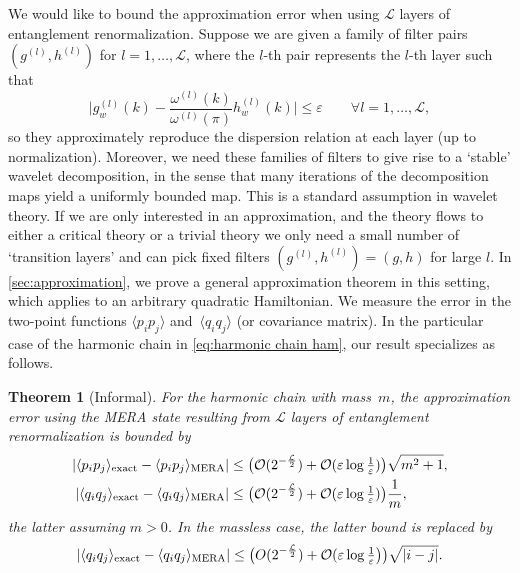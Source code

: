 \documentclass[submission, Phys]{SciPost}
\newtheorem*{thm*}{Theorem}
\theoremstyle{definition}
\theoremstyle{remark}
\DeclareMathOperator{\mera}{MERA}
\DeclareMathOperator{\exact}{exact}
\DeclarePairedDelimiter{\abs}{\lvert}{\rvert}
\newcommand{\eps}{\varepsilon}
\newcommand{\cL}{\mathcal L}
\newcommand{\change}[1]{#1}
\begin{document}
\change{We would like to bound the approximation error when using $\cL$ layers of entanglement renormalization}.
Suppose we are given a family of filter pairs $(g^{(l)},h^{(l)})$ for $l=1, \ldots, \cL$, where the $l$-th pair represents the $l$-th layer such that
\begin{equation}\label{eq:approximate phase main}
  \bigl\lvert g^{(l)}_w(k) - \frac {\omega^{(l)}(k)}{\omega^{(l)}(\pi)} h^{(l)}_w(k) \bigr\lvert \leq \eps
\qquad \forall l=1,\dots, \cL,
\end{equation}
so they approximately reproduce the dispersion relation at each layer (up to normalization).
Moreover, we need these families of filters to give rise to a `stable' wavelet decomposition, in the sense that many iterations of the decomposition maps yield a uniformly bounded map.
This is a standard assumption in wavelet theory.
If we are only interested in an approximation, and the theory flows to either a critical theory or a trivial theory we only need a small number of `transition layers' and can pick fixed filters $(g^{(l)},h^{(l)}) = (g,h)$ for large $l$.
In \cref{sec:approximation}, we prove a general approximation theorem in this setting, which applies to an arbitrary quadratic Hamiltonian.
We measure the error in the two-point functions $\langle p_i p_j \rangle$ and~$\langle q_i q_j \rangle$ (or covariance matrix).
In the particular case of the harmonic chain in \cref{eq:harmonic chain ham}, our result specializes as follows.

\begin{thm*}[Informal]\label{thm:harmonic chain}
For the harmonic chain with mass~$m$, the approximation error \change{using the MERA state resulting from $\cL$ layers of entanglement renormalization} is bounded by
\begin{equation*}\begin{aligned}
  \abs{\langle p_i p_j \rangle_{\exact} - \langle p_i p_j \rangle_{\mera}} &\leq \bigl(\mathcal O(2^{-\frac{\cL}{2}}) + \mathcal O(\eps \log\tfrac1\eps) \bigr)\sqrt{m^2 + 1}, \\
  \abs{\langle q_i q_j \rangle_{\exact} - \langle q_i q_j \rangle_{\mera}} &\leq \bigl(\mathcal O(2^{-\frac{\cL}{2}}) + \mathcal O(\eps \log\tfrac1\eps)\bigr)\frac{1}{m},
\end{aligned}\end{equation*}
the latter assuming $m>0$. In the massless case, the latter bound is replaced by
\begin{equation*}
  \abs{\langle q_i q_j \rangle_{\exact} - \langle q_i q_j \rangle_{\mera}} \leq \bigl(O(2^{-\frac{\cL}{2}}) + \mathcal O(\eps \log\tfrac1\eps\bigr)\bigr)\sqrt{\lvert i-j \rvert}.
\end{equation*}
\end{thm*}
\end{document}
